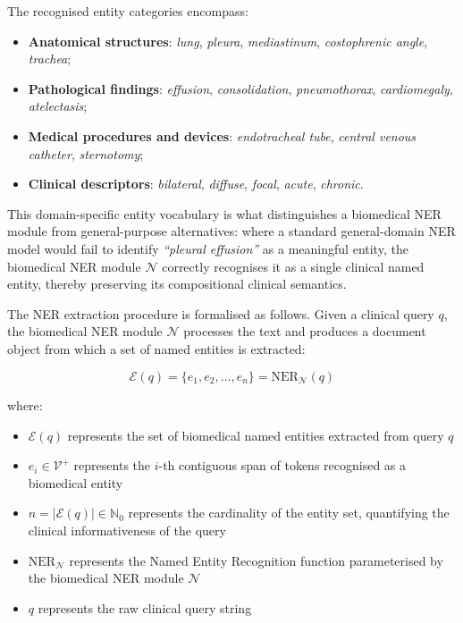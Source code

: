 The recognised entity categories encompass:

\begin{itemize}
    \item \textbf{Anatomical structures}: \textit{lung}, \textit{pleura}, \textit{mediastinum}, \textit{costophrenic angle}, \textit{trachea};
    \item \textbf{Pathological findings}: \textit{effusion}, \textit{consolidation}, \textit{pneumothorax}, \textit{cardiomegaly}, \textit{atelectasis};
    \item \textbf{Medical procedures and devices}: \textit{endotracheal tube}, \textit{central venous catheter}, \textit{sternotomy};
    \item \textbf{Clinical descriptors}: \textit{bilateral}, \textit{diffuse}, \textit{focal}, \textit{acute}, \textit{chronic}.
\end{itemize}

This domain-specific entity vocabulary is what distinguishes a biomedical NER module from general-purpose alternatives: where a standard general-domain NER model would fail to identify \textit{``pleural effusion''} as a meaningful entity, the biomedical NER module $\mathcal{N}$ correctly recognises it as a single clinical named entity, thereby preserving its compositional clinical semantics.

The NER extraction procedure is formalised as follows. Given a clinical query $q$, the biomedical NER module $\mathcal{N}$ processes the text and produces a document object from which a set of named entities is extracted:

$$
\mathcal{E}(q) = \{e_1, e_2, \ldots, e_n\} = \text{NER}_{\mathcal{N}}(q)
$$

where:
\begin{itemize}
\item $\mathcal{E}(q)$ represents the set of biomedical named entities extracted from query $q$
\item $e_i \in \mathcal{V}^+$ represents the $i$-th contiguous span of tokens recognised as a biomedical entity
\item $n = |\mathcal{E}(q)| \in \mathbb{N}_0$ represents the cardinality of the entity set, quantifying the clinical informativeness of the query
\item $\text{NER}_{\mathcal{N}}$ represents the Named Entity Recognition function parameterised by the biomedical NER module $\mathcal{N}$
\item $q$ represents the raw clinical query string
\end{itemize}

